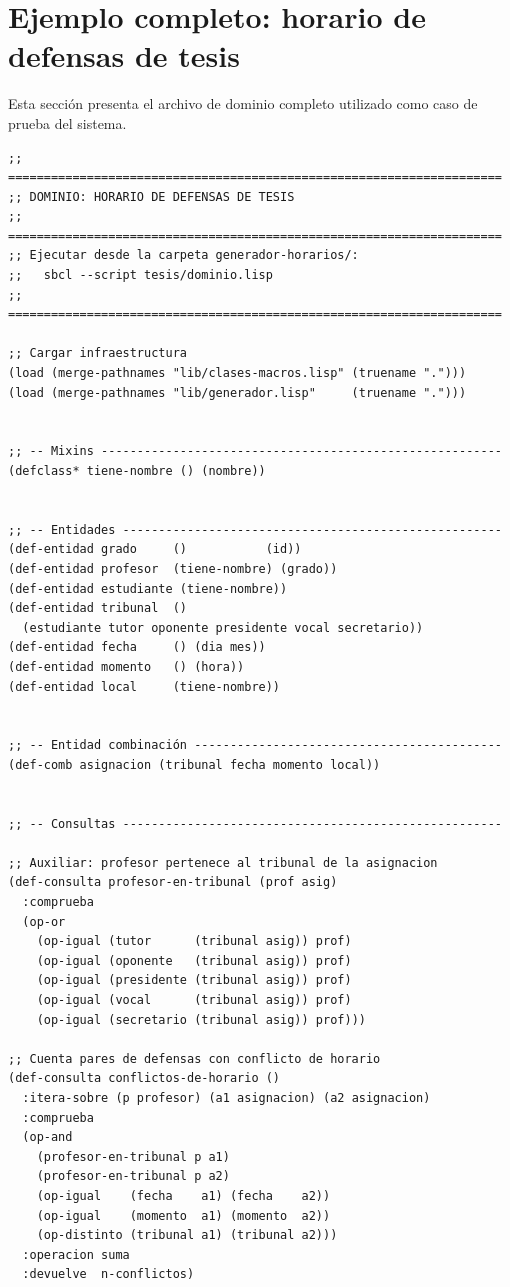 \documentclass[12pt,a4paper]{article}
\begin{document}
\section{Ejemplo completo: horario de defensas de tesis}
\label{sec:ejemplo}

Esta sección presenta el archivo de dominio completo utilizado como caso
de prueba del sistema.

\begin{lstlisting}[style=lisp, caption={Archivo completo: tesis/dominio.lisp}]
;; =====================================================================
;; DOMINIO: HORARIO DE DEFENSAS DE TESIS
;; =====================================================================
;; Ejecutar desde la carpeta generador-horarios/:
;;   sbcl --script tesis/dominio.lisp
;; =====================================================================

;; Cargar infraestructura
(load (merge-pathnames "lib/clases-macros.lisp" (truename ".")))
(load (merge-pathnames "lib/generador.lisp"     (truename ".")))


;; -- Mixins --------------------------------------------------------
(defclass* tiene-nombre () (nombre))


;; -- Entidades -----------------------------------------------------
(def-entidad grado     ()           (id))
(def-entidad profesor  (tiene-nombre) (grado))
(def-entidad estudiante (tiene-nombre))
(def-entidad tribunal  ()
  (estudiante tutor oponente presidente vocal secretario))
(def-entidad fecha     () (dia mes))
(def-entidad momento   () (hora))
(def-entidad local     (tiene-nombre))


;; -- Entidad combinación -------------------------------------------
(def-comb asignacion (tribunal fecha momento local))


;; -- Consultas -----------------------------------------------------

;; Auxiliar: profesor pertenece al tribunal de la asignacion
(def-consulta profesor-en-tribunal (prof asig)
  :comprueba
  (op-or
    (op-igual (tutor      (tribunal asig)) prof)
    (op-igual (oponente   (tribunal asig)) prof)
    (op-igual (presidente (tribunal asig)) prof)
    (op-igual (vocal      (tribunal asig)) prof)
    (op-igual (secretario (tribunal asig)) prof)))

;; Cuenta pares de defensas con conflicto de horario
(def-consulta conflictos-de-horario ()
  :itera-sobre (p profesor) (a1 asignacion) (a2 asignacion)
  :comprueba
  (op-and
    (profesor-en-tribunal p a1)
    (profesor-en-tribunal p a2)
    (op-igual    (fecha    a1) (fecha    a2))
    (op-igual    (momento  a1) (momento  a2))
    (op-distinto (tribunal a1) (tribunal a2)))
  :operacion suma
  :devuelve  n-conflictos)


\end{lstlisting}
\end{document}
